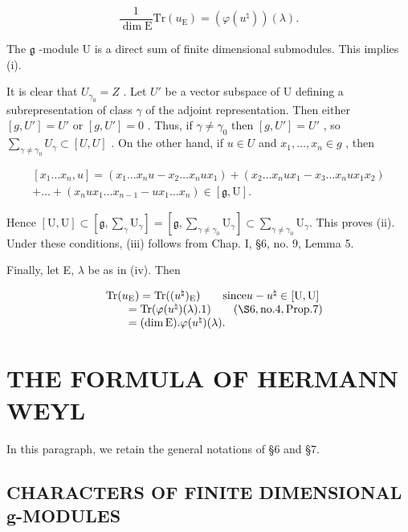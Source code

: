 \[
\frac {1}{\dim \mathrm{E}} \mathrm{Tr} (u _ {\mathrm{E}}) = (\varphi (u ^ {\natural})) (\lambda).
\]

The \(\mathfrak{g}\) -module U is a direct sum of finite dimensional submodules. This implies (i).

It is clear that \(U_{\gamma_{0}} = Z\) . Let \(U'\) be a vector subspace of U defining a subrepresentation of class \(\gamma\) of the adjoint representation. Then either \([g, U'] = U'\) or \([g, U'] = 0\) . Thus, if \(\gamma \neq \gamma_{0}\) then \([g, U'] = U'\) , so \(\sum_{\gamma \neq \gamma_{0}} U_{\gamma} \subset [U, U]\) . On the other hand, if \(u \in U\) and \(x_{1}, \ldots, x_{n} \in g\) , then

\[
\begin{array}{c} [ x _ {1} \ldots x _ {n}, u ] = (x _ {1} \ldots x _ {n} u - x _ {2} \ldots x _ {n} u x _ {1}) + (x _ {2} \ldots x _ {n} u x _ {1} - x _ {3} \ldots x _ {n} u x _ {1} x _ {2}) \\ + \dots + (x _ {n} u x _ {1} \ldots x _ {n - 1} - u x _ {1} \ldots x _ {n}) \in [ \mathfrak {g}, \mathrm{U} ]. \end{array}
\]

Hence \([\mathrm{U},\mathrm{U}]\subset \left[\mathfrak{g},\sum_{\gamma}\mathrm{U}_{\gamma}\right] = \left[\mathfrak{g},\sum_{\gamma \neq \gamma_0}\mathrm{U}_\gamma \right]\subset \sum_{\gamma \neq \gamma_0}\mathrm{U}_\gamma .\) This proves (ii). Under these conditions, (iii) follows from Chap. I, §6, no. 9, Lemma 5.

Finally, let E, \(\lambda\) be as in (iv). Then

\[
\begin{array}{r l} & {\mathrm{Tr} (u _ {\mathrm{E}}) = \mathrm{Tr} ((u ^ {\natural}) _ {\mathrm{E}}) \qquad \text {since} u - u ^ {\natural} \in [ \mathrm{U}, \mathrm{U} ]} \\ & {\qquad = \mathrm{Tr} (\varphi (u ^ {\natural}) (\lambda). 1) \qquad (\S 6, \text {no.} 4, \text {Prop.} 7)} \\ & {\qquad = (\dim \mathrm{E}). \varphi (u ^ {\natural}) (\lambda).} \end{array}
\]

\section{THE FORMULA OF HERMANN WEYL}

In this paragraph, we retain the general notations of §6 and §7.

\subsection{CHARACTERS OF FINITE DIMENSIONAL g-MODULES}

